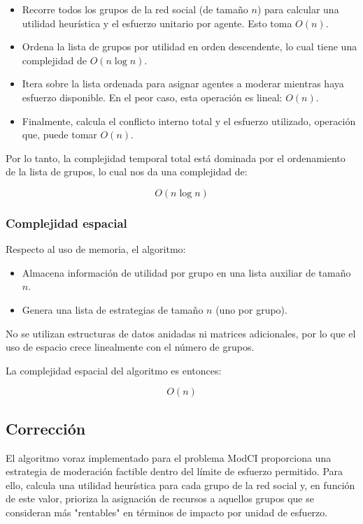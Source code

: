 \documentclass[11pt,letter]{article}
\begin{document}
\begin{itemize}
    \item Recorre todos los grupos de la red social (de tamaño $n$) para calcular una utilidad heurística y el esfuerzo unitario por agente. Esto toma ${O}(n)$.
    \item Ordena la lista de grupos por utilidad en orden descendente, lo cual tiene una complejidad de ${O}(n \log n)$.
    \item Itera sobre la lista ordenada para asignar agentes a moderar mientras haya esfuerzo disponible. En el peor caso, esta operación es lineal: ${O}(n)$.
    \item Finalmente, calcula el conflicto interno total y el esfuerzo utilizado, operación que, puede tomar ${O}(n)$.
\end{itemize}

Por lo tanto, la complejidad temporal total está dominada por el ordenamiento de la lista de grupos, lo cual nos da una complejidad de:

\[
{O}(n \log n)
\]

\subsubsection{Complejidad espacial}

Respecto al uso de memoria, el algoritmo:

\begin{itemize}
    \item Almacena información de utilidad por grupo en una lista auxiliar de tamaño $n$.
    \item Genera una lista de estrategias de tamaño $n$ (uno por grupo).
\end{itemize}

No se utilizan estructuras de datos anidadas ni matrices adicionales, por lo que el uso de espacio crece linealmente con el número de grupos.

La complejidad espacial del algoritmo es entonces:

\[
{O}(n)
\]

\subsection{Corrección}

El algoritmo voraz implementado para el problema ModCI proporciona una estrategia de moderación factible dentro del límite de esfuerzo permitido. Para ello, calcula una utilidad heurística para cada grupo de la red social y, en función de este valor, prioriza la asignación de recursos a aquellos grupos que se consideran más "rentables" en términos de impacto por unidad de esfuerzo.
\end{document}
